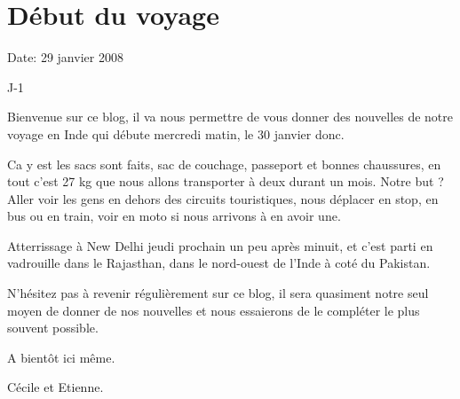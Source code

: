 \section{Début du voyage}

Date: 29 janvier 2008

\begin{multicols}{2}

J-1

Bienvenue sur ce blog, il va nous permettre de vous donner des nouvelles de notre voyage en Inde qui débute mercredi matin, le 30 janvier donc.

Ca y est les sacs sont faits, sac de couchage, passeport et bonnes chaussures, en tout c'est 27 kg que nous allons transporter à deux durant un mois. Notre but ? Aller voir les gens en dehors des circuits touristiques, nous déplacer en stop, en bus ou en train, voir en moto si nous arrivons à en avoir une.

Atterrissage à New Delhi jeudi prochain un peu après minuit, et c'est parti en vadrouille dans le Rajasthan, dans le nord-ouest de l'Inde à coté du Pakistan.

N'hésitez pas à revenir régulièrement sur ce blog, il sera quasiment notre seul moyen de donner de nos nouvelles et nous essaierons de le compléter le plus souvent possible.

A bientôt ici même.

Cécile et Etienne.

\end{multicols}


